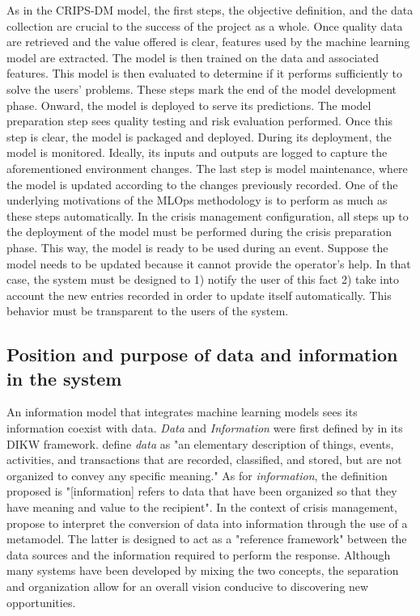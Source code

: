 As in the CRIPS-DM model, the first steps, the objective definition, and the data collection are crucial to the success of the project as a whole.
Once quality data are retrieved and the value offered is clear, features used by the machine learning model are extracted.
The model is then trained on the data and associated features.
This model is then evaluated to determine if it performs sufficiently to solve the users' problems.
These steps mark the end of the model development phase.
Onward, the model is deployed to serve its predictions.
The model preparation step sees quality testing and risk evaluation performed.
Once this step is clear, the model is packaged and deployed.
During its deployment, the model is monitored.
Ideally, its inputs and outputs are logged to capture the aforementioned environment changes.
The last step is model maintenance, where the model is updated according to the changes previously recorded.
One of the underlying motivations of the MLOps methodology is to perform as much as these steps automatically.
In the crisis management configuration, all steps up to the deployment of the model must be performed during the crisis preparation phase.
This way, the model is ready to be used during an event.
Suppose the model needs to be updated because it cannot provide the operator's help.
In that case, the system must be designed to 1) notify the user of this fact 2) take into account the new entries recorded in order to update itself automatically.
This behavior must be transparent to the users of the system.

\subsection{Position and purpose of data and information in the system}
An information model that integrates machine learning models sees its information coexist with data.
\emph{Data} and \emph{Information} were first defined by \textcite{ackoffDataWisdom1989} in its DIKW framework.
\textcite{rainerIntroductionInformationSystems2021} define \emph{data} as "an elementary description
of things, events, activities, and transactions that are recorded, classified, and stored,
but are not organized to convey any specific meaning."
As for \emph{information}, the definition proposed is "[information] refers to data
that have been organized so that they have meaning and value to the recipient".
In the context of crisis management, \textcite{benabenConceptualFrameworkSuite2017} propose to interpret the conversion of data into information through the use of a metamodel.
The latter is designed to act as a "reference framework" between the data sources and the information required to perform the response.
Although many systems have been developed by mixing the two concepts, the separation and organization allow for an overall vision conducive to discovering new opportunities.

